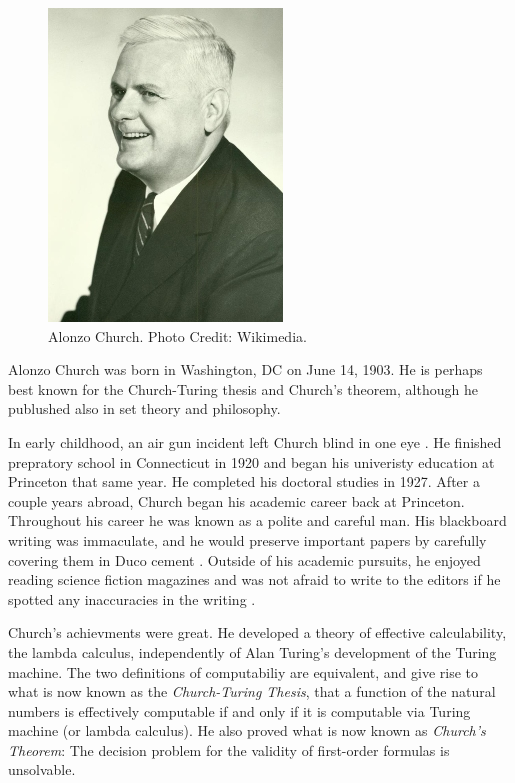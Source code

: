 \documentclass[../../../include/open-logic-section]{subfiles}
\begin{document}
\begin{figure}[h!]
\centering 
\includegraphics[scale=1]{alonzo-church.jpg} 
\caption{Alonzo
Church. Photo Credit: Wikimedia.} 
\end{figure}

Alonzo Church was born in Washington, DC on June 14, 1903. He is perhaps
best known for the Church-Turing thesis and Church's theorem, although he
publushed also in set theory and philosophy.
 
In early childhood, an air gun incident left Church blind in one eye
\citep[2]{EndertonND}. He finished prepratory school in Connecticut in
1920 and began his univeristy education at Princeton that same year. He
completed his doctoral studies in 1927. After a couple years abroad, Church
began his academic career back at Princeton. Throughout his career he was
known as a polite and careful man. His blackboard writing was immaculate,
and he would preserve important papers by carefully covering them in Duco
cement \citep[4]{EndertonND}. Outside of his academic pursuits, he
enjoyed reading science fiction magazines and was not afraid to write to
the editors if he spotted any inaccuracies in the writing
\citep[5]{EndertonND}.

Church's achievments were great. He developed a theory of effective
calculability, the lambda calculus, independently of Alan Turing's
development of the Turing machine. The two definitions of computabiliy are
equivalent, and give rise to what is now known as the \emph{Church-Turing
Thesis}, that a function of the natural numbers is effectively computable
if and only if it is computable via Turing machine (or lambda calculus). He
also proved what is now known as \emph{Church's Theorem}: The decision
problem for the validity of first-order formulas is unsolvable.
\end{document}
